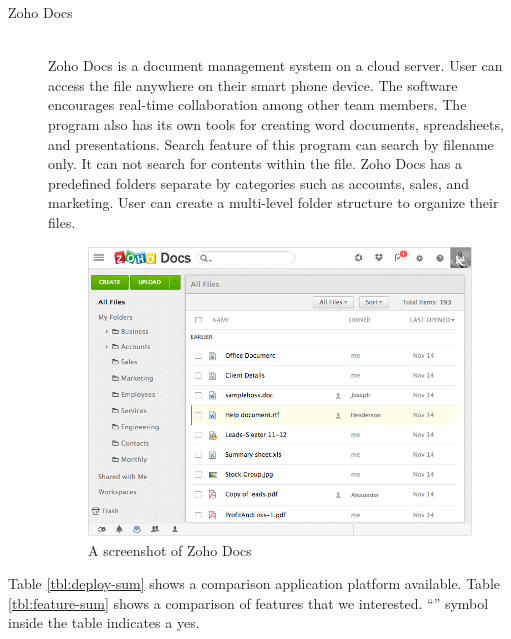 \begin{description}
\item[Zoho Docs] \hfill \\
Zoho Docs is a document management system on a cloud server.
User can access the file anywhere on their smart phone device.
The software encourages real-time collaboration among other team members.
The program also has its own tools for creating word documents, spreadsheets, and presentations.
Search feature of this program can search by filename only.
It can not search for contents within the file.
Zoho Docs has a predefined folders separate by categories such as accounts, sales, and marketing.
User can create a multi-level folder structure to organize their files.
\begin{figure}[ht]
	\centering
	\includegraphics[scale=0.55]{res/literature/screenshot_zoho}
	\caption{A screenshot of Zoho Docs  \cite{zoho-doc}}
\end{figure}
\end{description}

Table \ref{tbl:deploy-sum} shows a comparison application platform available.
Table \ref{tbl:feature-sum} shows a comparison of features that we interested.
\enquote{\checkmark} symbol inside the table indicates a yes.

\clearpage

